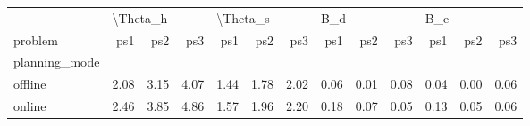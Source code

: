 \begin{tabular}{lrrrrrrrrrrrr}
\toprule
{} & \multicolumn{3}{l}{\textbackslash Theta\_h} & \multicolumn{3}{l}{\textbackslash Theta\_s} & \multicolumn{3}{l}{B\_d} & \multicolumn{3}{l}{B\_e} \\
problem &      ps1 &  ps2 &  ps3 &      ps1 &  ps2 &  ps3 &  ps1 &  ps2 &  ps3 &  ps1 &  ps2 &  ps3 \\
planning\_mode &          &      &      &          &      &      &      &      &      &      &      &      \\
\midrule
offline       &     2.08 & 3.15 & 4.07 &     1.44 & 1.78 & 2.02 & 0.06 & 0.01 & 0.08 & 0.04 & 0.00 & 0.06 \\
online        &     2.46 & 3.85 & 4.86 &     1.57 & 1.96 & 2.20 & 0.18 & 0.07 & 0.05 & 0.13 & 0.05 & 0.06 \\
\bottomrule
\end{tabular}

